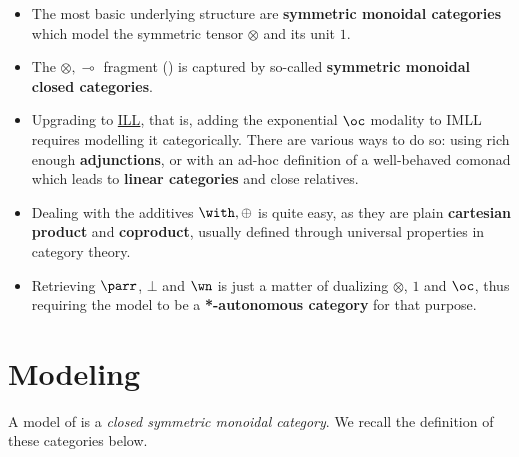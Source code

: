 \begin{itemize}
\item The most basic underlying structure are \textbf{symmetric monoidal
  categories} which model the symmetric tensor \(\otimes\) and its unit
  \(1\).
\item The \(\otimes, \multimap\) fragment () is captured by
  so-called \textbf{symmetric monoidal closed categories}.
\item Upgrading to \hyperref[intuitionistic-linear-logic]{ILL}, that is, adding the exponential \(\oc\)
  modality to IMLL requires modelling it categorically. There are
  various ways to do so: using rich enough \textbf{adjunctions}, or with
  an ad-hoc definition of a well-behaved comonad which leads to
  \textbf{linear categories} and close relatives.
\item Dealing with the additives \(\with, \oplus\) is quite easy, as they
  are plain \textbf{cartesian product} and \textbf{coproduct}, usually
  defined through universal properties in category theory.
\item Retrieving \(\parr\), \(\bot\) and \(\wn\) is just a matter of
  dualizing \(\otimes\), \(1\) and \(\oc\), thus requiring the model to
  be a \textbf{*-autonomous category} for that purpose.
\end{itemize}

\section{\texorpdfstring{Modeling }{Modeling IMLL}}\label{modeling-imll}

A model of  is a \emph{closed symmetric monoidal category}. We
recall the definition of these categories below.


